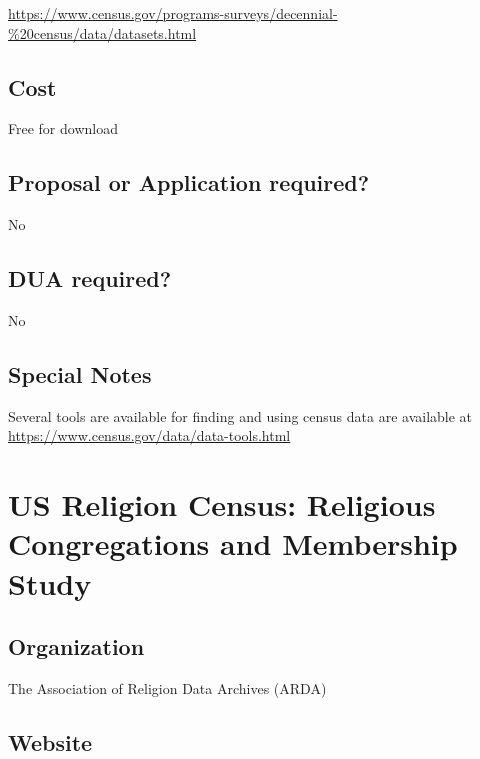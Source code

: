 \documentclass[
]{book}
\begin{document}
\url{https://www.census.gov/programs-surveys/decennial-\%20census/data/datasets.html}

\hypertarget{cost-94}{%
\section{Cost}\label{cost-94}}

Free for download

\hypertarget{proposal-or-application-required-94}{%
\section{Proposal or Application required?}\label{proposal-or-application-required-94}}

No

\hypertarget{dua-required-94}{%
\section{DUA required?}\label{dua-required-94}}

No

\hypertarget{special-notes-94}{%
\section{Special Notes}\label{special-notes-94}}

Several tools are available for finding and using census data are available at \url{https://www.census.gov/data/data-tools.html}

\mainmatter

\hypertarget{us-religion-census-religious-congregations-and-membership-study}{%
\chapter{US Religion Census: Religious Congregations and Membership Study}\label{us-religion-census-religious-congregations-and-membership-study}}

\hypertarget{organization-95}{%
\section{Organization}\label{organization-95}}

The Association of Religion Data Archives (ARDA)

\hypertarget{website-95}{%
\section{Website}\label{website-95}}
\end{document}
